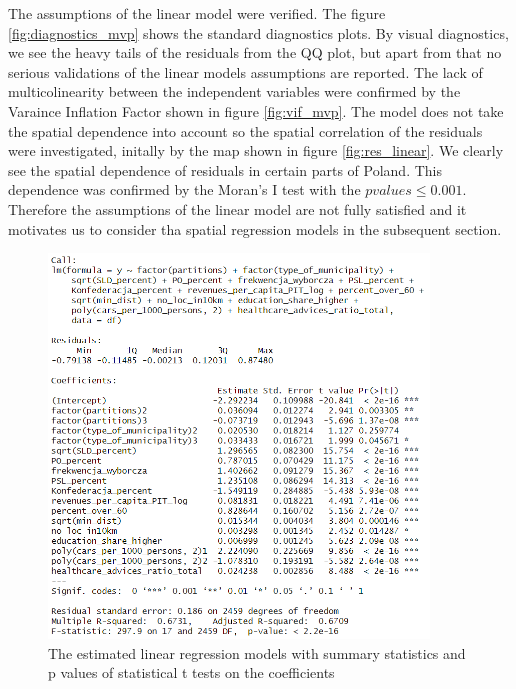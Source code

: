 \documentclass[a4paper,12pt]{article} %
\begin{document}
The assumptions of the linear model were verified. The figure \ref{fig:diagnostics_mvp} shows the standard diagnostics plots. By visual diagnostics, we see the heavy tails of the residuals from the QQ plot, but apart from that no serious validations of the linear models assumptions are reported. The lack of multicolinearity between the independent variables were confirmed by the Varaince Inflation Factor shown in figure \ref{fig:vif_mvp}. The model does not take the spatial dependence into account so the spatial correlation of the residuals were investigated, initally by the map shown in figure \ref{fig:res_linear}. We clearly see the spatial dependence of residuals in certain parts of Poland. This dependence was confirmed by the Moran’s I test with the $p values \leq 0.001$. Therefore the assumptions of the linear model are not fully satisfied and it motivates us to consider tha spatial regression models in the subsequent section.

\begin{figure}[htp]
    \centering
    \includegraphics[width=0.9\textwidth]{assets/coefficients_regression_simple.png}
    \caption{The estimated linear regression models with summary statistics and p values of statistical t tests on the coefficients}
    \label{fig:coefficients_regression_simple}
\end{figure}
\end{document}
